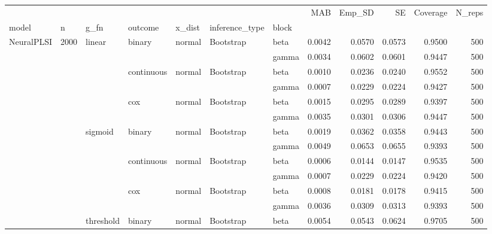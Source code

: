 \begin{tabular}{lllllllrrrrr}
\toprule
 &  &  &  &  &  &  & MAB & Emp_SD & SE & Coverage & N_reps \\
model & n & g_fn & outcome & x_dist & inference_type & block &  &  &  &  &  \\
\midrule
\multirow[t]{18}{*}{NeuralPLSI} & \multirow[t]{18}{*}{2000} & \multirow[t]{6}{*}{linear} & \multirow[t]{2}{*}{binary} & \multirow[t]{2}{*}{normal} & \multirow[t]{2}{*}{Bootstrap} & beta & 0.0042 & 0.0570 & 0.0573 & 0.9500 & 500 \\
 &  &  &  &  &  & gamma & 0.0034 & 0.0602 & 0.0601 & 0.9447 & 500 \\
\cline{4-12} \cline{5-12} \cline{6-12}
 &  &  & \multirow[t]{2}{*}{continuous} & \multirow[t]{2}{*}{normal} & \multirow[t]{2}{*}{Bootstrap} & beta & 0.0010 & 0.0236 & 0.0240 & 0.9552 & 500 \\
 &  &  &  &  &  & gamma & 0.0007 & 0.0229 & 0.0224 & 0.9427 & 500 \\
\cline{4-12} \cline{5-12} \cline{6-12}
 &  &  & \multirow[t]{2}{*}{cox} & \multirow[t]{2}{*}{normal} & \multirow[t]{2}{*}{Bootstrap} & beta & 0.0015 & 0.0295 & 0.0289 & 0.9397 & 500 \\
 &  &  &  &  &  & gamma & 0.0035 & 0.0301 & 0.0306 & 0.9447 & 500 \\
\cline{3-12} \cline{4-12} \cline{5-12} \cline{6-12}
 &  & \multirow[t]{6}{*}{sigmoid} & \multirow[t]{2}{*}{binary} & \multirow[t]{2}{*}{normal} & \multirow[t]{2}{*}{Bootstrap} & beta & 0.0019 & 0.0362 & 0.0358 & 0.9443 & 500 \\
 &  &  &  &  &  & gamma & 0.0049 & 0.0653 & 0.0655 & 0.9393 & 500 \\
\cline{4-12} \cline{5-12} \cline{6-12}
 &  &  & \multirow[t]{2}{*}{continuous} & \multirow[t]{2}{*}{normal} & \multirow[t]{2}{*}{Bootstrap} & beta & 0.0006 & 0.0144 & 0.0147 & 0.9535 & 500 \\
 &  &  &  &  &  & gamma & 0.0007 & 0.0229 & 0.0224 & 0.9420 & 500 \\
\cline{4-12} \cline{5-12} \cline{6-12}
 &  &  & \multirow[t]{2}{*}{cox} & \multirow[t]{2}{*}{normal} & \multirow[t]{2}{*}{Bootstrap} & beta & 0.0008 & 0.0181 & 0.0178 & 0.9415 & 500 \\
 &  &  &  &  &  & gamma & 0.0036 & 0.0309 & 0.0313 & 0.9393 & 500 \\
\cline{3-12} \cline{4-12} \cline{5-12} \cline{6-12}
 &  & \multirow[t]{6}{*}{threshold} & \multirow[t]{2}{*}{binary} & \multirow[t]{2}{*}{normal} & \multirow[t]{2}{*}{Bootstrap} & beta & 0.0054 & 0.0543 & 0.0624 & 0.9705 & 500 \\

\end{tabular}
